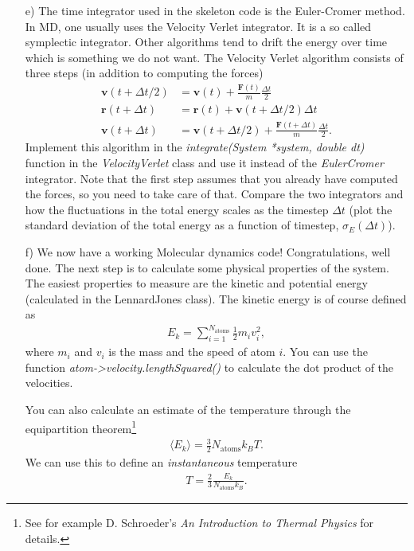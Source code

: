 \documentclass[11pt,a4wide]{article}
\renewcommand{\vec}{\mathbf}
\begin{document}
\begin{enumerate}
\item[e)]
The time integrator used in the skeleton code is the Euler-Cromer method. In MD, one usually uses the Velocity Verlet integrator. It is a so called symplectic integrator. Other algorithms tend to drift the energy over time which is something we do not want. The Velocity Verlet algorithm consists of three steps (in addition to computing the forces)
\begin{align}
	\vec v(t + \Delta t/2) &= \vec v(t) + \frac{\vec F(t)}{m}\frac{\Delta t}{2}\\
	\vec r(t + \Delta t) &= \vec r(t) + \vec v(t + \Delta t/2)\Delta t\\
	\vec v(t + \Delta t) &= \vec v(t + \Delta t/2) + \frac{\vec F(t + \Delta t)}{m}\frac{\Delta t}{2}.
\end{align}
Implement this algorithm in the \textit{integrate(System *system, double dt)} function in the \textit{VelocityVerlet} class and use it instead of the \textit{EulerCromer} integrator. Note that the first step assumes that you already have computed the forces, so you need to take care of that. Compare the two integrators and how the fluctuations in the total energy scales as the timestep $\Delta t$ (plot the standard deviation of the total energy as a function of timestep, $\sigma_E(\Delta t)$).

\item[f)]
We now have a working Molecular dynamics code! Congratulations, well done. The next step is to calculate some physical properties of the system. The easiest properties to measure are the kinetic and potential energy (calculated in the LennardJones class). The kinetic energy is of course defined as
\begin{align}
	E_k = \sum_{i=1}^{N_\text{atoms}} \frac{1}{2} m_i v_i^2,
\end{align}
where $m_i$ and $v_i$ is the mass and the speed of atom $i$. You can use the function \textit{atom->velocity.lengthSquared()} to calculate the dot product of the velocities. 

You can also calculate an estimate of the temperature through the equipartition theorem\footnote{See for example D. Schroeder's \textit{An Introduction to Thermal Physics} for details.}
\begin{align}
	\langle E_k \rangle = \frac{3}{2}N_\text{atoms} k_B T.
\end{align}
We can use this to define an \textit{instantaneous} temperature
\begin{align}
	\label{eq:temperature}
	T = \frac{2}{3}\frac{E_k}{N_\text{atoms} k_B}.
\end{align}


\end{enumerate}
\end{document}
